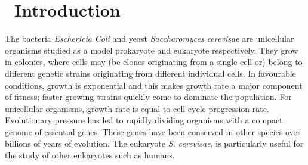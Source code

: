 \graphicspath{{images/}}

\section{\thesection~Introduction}
\label{sec:introduction}





The bacteria \textit{Eschericia Coli} and yeast \textit{Saccharomyces
  cerevisae} are unicellular organisms studied as a model prokaryote
and eukaryote respectively. They grow in colonies, where cells may (be
clones originating from a single cell or) belong to different genetic
strains originating from different individual cells. In favourable
conditions, growth is exponential and this makes growth rate a major
component of fitness; faster growing strains quickly come to dominate
the population. For unicellular organisms, growth rate is equal to
cell cycle progression rate. Evolutionary pressure has led to rapidly
dividing organisms with a compact genome of essential genes. These
genes have been conserved in other species over billions of years of
evolution. The eukaryote \textit{S. cerevisae}, is particularly useful
for the study of other eukaryotes such as humans.

